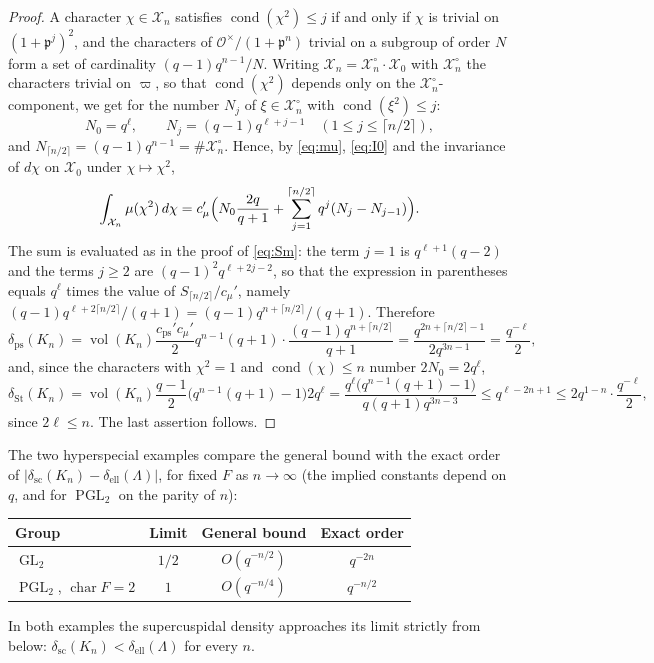 \documentclass[11pt,reqno]{amsart}
\numberwithin{equation}{section}
\theoremstyle{plain}
\theoremstyle{definition}
\theoremstyle{remark}
\theoremstyle{plain}
\newcommand{\OO}{\mathcal{O}}    %
\newcommand{\pp}{\mathfrak{p}}   %
\newcommand{\Lat}{\mathcal{L}}   %
\newcommand{\dLat}{\Lambda}      %
\newcommand{\g}{\mathfrak{g}}    %
\newcommand{\gd}{\mathfrak{g}^*} %
\newcommand{\scd}[1]{\delta_{\mathrm{sc}}(#1)}
\newcommand{\elld}[2][]{\delta_{\mathrm{ell}}^{#1}(#2)}  %
\newcommand{\Pps}{\delta_{\mathrm{ps}}(K_n)}       %
\newcommand{\Pst}{\delta_{\mathrm{St}}(K_n)}
\newcommand{\Cps}{c_{\mathrm{ps}}}
\newcommand{\Cmu}{c_\mu}
\newcommand{\Xc}{\mathcal{X}}                   %
\newcommand{\abs}[1]{\lvert#1\rvert}
\DeclareMathOperator{\vol}{vol}
\DeclareMathOperator{\GL}{GL}
\DeclareMathOperator{\PGL}{PGL}
\DeclareMathOperator{\chr}{char}   %
\DeclareMathOperator{\cond}{cond}   %
\begin{document}
\begin{proof}
A character $\chi\in\Xc_n$ satisfies $\cond(\chi^2)\le j$ if and
only if $\chi$ is trivial on $(1+\pp^j)^2$, and the characters of
$\OO^\times/(1+\pp^n)$ trivial on a subgroup of order $N$ form a
set of cardinality $(q-1)q^{n-1}/N$. Writing $\Xc_n=\Xc_n^{\circ}\cdot\Xc_0$
with $\Xc_n^\circ$ the characters trivial on $\varpi$, so that
$\cond(\chi^2)$ depends only on the $\Xc_n^\circ$-component, we get for
the number $N_j$ of $\xi\in\Xc_n^\circ$ with $\cond(\xi^2)\le j$:
\[
N_0=q^\ell,\qquad N_j=(q-1)q^{\ell+j-1}\quad(1\le j\le\lceil n/2\rceil),
\]
and $N_{\lceil n/2\rceil}=(q-1)q^{n-1}=\#\Xc_n^\circ$. Hence, by
\eqref{eq:mu}, \eqref{eq:I0} and the invariance of $d\chi$ on $\Xc_0$
under $\chi\mapsto\chi^2$,
\[
\int_{\Xc_n}\mu(\chi^2)\,d\chi
=\Cmu'\Bigl(N_0\frac{2q}{q+1}+\sum_{j=1}^{\lceil n/2\rceil}q^j(N_j-N_{j-1})\Bigr).
\]
The sum is evaluated as in the proof of \eqref{eq:Sm}: the term $j=1$
is $q^{\ell+1}(q-2)$ and the terms $j\ge2$ are $(q-1)^2q^{\ell+2j-2}$, so
that the expression in parentheses equals $q^\ell$ times the value of
$S_{\lceil n/2\rceil}/\Cmu'$, namely $(q-1)q^{\ell+2\lceil n/2\rceil}/(q+1)=(q-1)q^{n+\lceil n/2\rceil}/(q+1)$.
Therefore
\[
\Pps=\vol(K_n)\frac{\Cps'\Cmu'}2q^{n-1}(q+1)\cdot\frac{(q-1)q^{n+\lceil n/2\rceil}}{q+1}
=\frac{q^{2n+\lceil n/2\rceil-1}}{2q^{3n-1}}=\frac{q^{-\ell}}2,
\]
and, since the characters with $\chi^2=1$ and $\cond(\chi)\le n$ number
$2N_0=2q^\ell$,
\[
\Pst=\vol(K_n)\frac{q-1}2\bigl(q^{n-1}(q+1)-1\bigr)2q^\ell
=\frac{q^\ell\bigl(q^{n-1}(q+1)-1\bigr)}{q(q+1)q^{3n-3}}
\le q^{\ell-2n+1}\le 2q^{1-n}\cdot\frac{q^{-\ell}}2,
\]
since $2\ell\le n$. The last assertion follows.
\end{proof}

The two hyperspecial examples compare the general bound with the
exact order of $\abs{\scd{K_n}-\elld{\dLat}}$, for fixed $F$ as $n\to\infty$
(the implied constants depend on $q$, and for $\PGL_2$ on the parity of
$n$):
\begin{center}
\begin{tabular}{lccc}
\toprule
Group & Limit & General bound & Exact order \\
\midrule
$\GL_2$ & $1/2$ & $O(q^{-n/2})$ & $q^{-2n}$ \\
$\PGL_2$, $\chr F=2$ & $1$ & $O(q^{-n/4})$ & $q^{-n/2}$ \\
\bottomrule
\end{tabular}
\end{center}
In both examples the supercuspidal density approaches its limit
strictly from below: $\scd{K_n}<\elld{\dLat}$ for every $n$.
\end{document}

